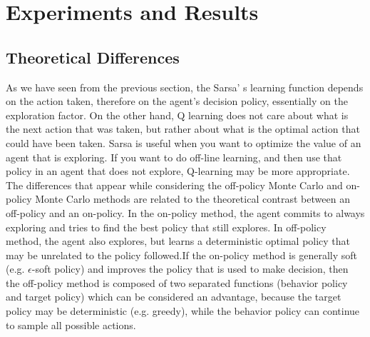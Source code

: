 \documentclass[paper=a4, fontsize=11pt]{scrartcl}
\numberwithin{equation}{section}		%
\numberwithin{figure}{section}			%
\numberwithin{table}{section}				%
\begin{document}
\section{Experiments and Results}
\label{results}

\subsection{Theoretical Differences}
As we have seen from the previous section, the Sarsa' s learning function depends on the action taken, therefore on the agent's decision policy, essentially on the exploration factor. On the other hand, Q learning does not care about what is the next action that was taken, but rather about what is the optimal action that could have been taken. Sarsa is useful when you want to optimize the value of an agent that is exploring. If you want to do off-line learning, and then use that policy in an agent that does not explore, Q-learning may be more appropriate.\\
The differences that appear while considering the off-policy Monte Carlo and on-policy Monte Carlo methods are related to the theoretical contrast between an off-policy and an on-policy. In the on-policy method, the agent commits to always exploring and tries to find the best policy that still explores. In off-policy method, the agent also explores, but learns a deterministic optimal policy that may be unrelated to the policy followed.If the on-policy  method is generally soft (e.g. $\epsilon$-soft policy) and improves the policy that is used to make decision, then the off-policy method is composed of two separated functions (behavior policy and target policy) which can be considered an advantage, because the target policy may be deterministic (e.g. greedy), while the behavior policy can continue to sample all possible actions.
\end{document}
